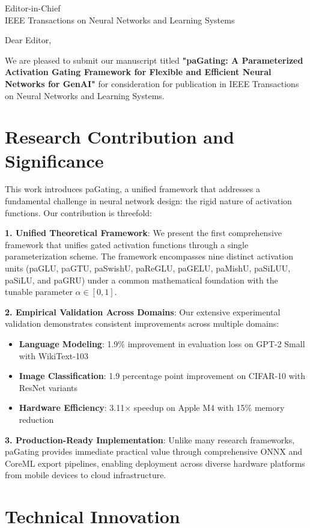 \documentclass[11pt]{letter}
\begin{document}
\begin{letter}{Editor-in-Chief\\
IEEE Transactions on Neural Networks and Learning Systems}

\opening{Dear Editor,}

We are pleased to submit our manuscript titled \textbf{"paGating: A Parameterized Activation Gating Framework for Flexible and Efficient Neural Networks for GenAI"} for consideration for publication in IEEE Transactions on Neural Networks and Learning Systems.

\section*{Research Contribution and Significance}

This work introduces paGating, a unified framework that addresses a fundamental challenge in neural network design: the rigid nature of activation functions. Our contribution is threefold:

\textbf{1. Unified Theoretical Framework}: We present the first comprehensive framework that unifies gated activation functions through a single parameterization scheme. The framework encompasses nine distinct activation units (paGLU, paGTU, paSwishU, paReGLU, paGELU, paMishU, paSiLUU, paSiLU, and paGRU) under a common mathematical foundation with the tunable parameter $\alpha \in [0,1]$.

\textbf{2. Empirical Validation Across Domains}: Our extensive experimental validation demonstrates consistent improvements across multiple domains:
\begin{itemize}
    \item \textbf{Language Modeling}: 1.9\% improvement in evaluation loss on GPT-2 Small with WikiText-103
    \item \textbf{Image Classification}: 1.9 percentage point improvement on CIFAR-10 with ResNet variants
    \item \textbf{Hardware Efficiency}: 3.11× speedup on Apple M4 with 15\% memory reduction
\end{itemize}

\textbf{3. Production-Ready Implementation}: Unlike many research frameworks, paGating provides immediate practical value through comprehensive ONNX and CoreML export pipelines, enabling deployment across diverse hardware platforms from mobile devices to cloud infrastructure.

\section*{Technical Innovation}


\end{letter}
\end{document}
